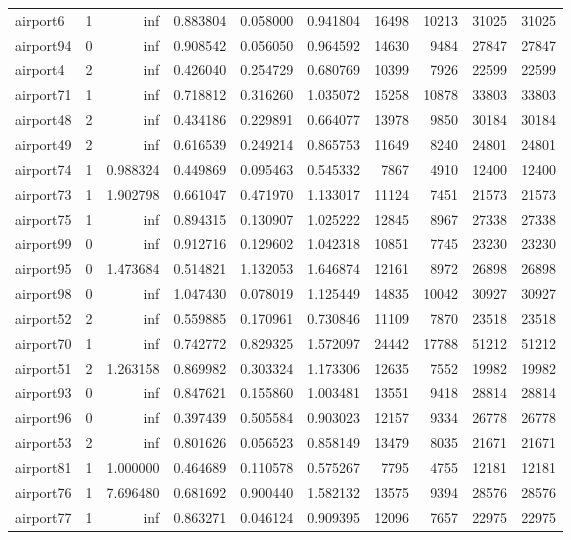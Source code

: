 \begin{longtable}{|l|r|r|r|r|r|r|r|r|r|}
airport6 & 1 & inf & 0.883804 & 0.058000 & 0.941804 & 16498 & 10213 & 31025 & 31025 \\
airport94 & 0 & inf & 0.908542 & 0.056050 & 0.964592 & 14630 & 9484 & 27847 & 27847 \\
airport4 & 2 & inf & 0.426040 & 0.254729 & 0.680769 & 10399 & 7926 & 22599 & 22599 \\
airport71 & 1 & inf & 0.718812 & 0.316260 & 1.035072 & 15258 & 10878 & 33803 & 33803 \\
airport48 & 2 & inf & 0.434186 & 0.229891 & 0.664077 & 13978 & 9850 & 30184 & 30184 \\
airport49 & 2 & inf & 0.616539 & 0.249214 & 0.865753 & 11649 & 8240 & 24801 & 24801 \\
airport74 & 1 & 0.988324 & 0.449869 & 0.095463 & 0.545332 & 7867 & 4910 & 12400 & 12400 \\
airport73 & 1 & 1.902798 & 0.661047 & 0.471970 & 1.133017 & 11124 & 7451 & 21573 & 21573 \\
airport75 & 1 & inf & 0.894315 & 0.130907 & 1.025222 & 12845 & 8967 & 27338 & 27338 \\
airport99 & 0 & inf & 0.912716 & 0.129602 & 1.042318 & 10851 & 7745 & 23230 & 23230 \\
airport95 & 0 & 1.473684 & 0.514821 & 1.132053 & 1.646874 & 12161 & 8972 & 26898 & 26898 \\
airport98 & 0 & inf & 1.047430 & 0.078019 & 1.125449 & 14835 & 10042 & 30927 & 30927 \\
airport52 & 2 & inf & 0.559885 & 0.170961 & 0.730846 & 11109 & 7870 & 23518 & 23518 \\
airport70 & 1 & inf & 0.742772 & 0.829325 & 1.572097 & 24442 & 17788 & 51212 & 51212 \\
airport51 & 2 & 1.263158 & 0.869982 & 0.303324 & 1.173306 & 12635 & 7552 & 19982 & 19982 \\
airport93 & 0 & inf & 0.847621 & 0.155860 & 1.003481 & 13551 & 9418 & 28814 & 28814 \\
airport96 & 0 & inf & 0.397439 & 0.505584 & 0.903023 & 12157 & 9334 & 26778 & 26778 \\
airport53 & 2 & inf & 0.801626 & 0.056523 & 0.858149 & 13479 & 8035 & 21671 & 21671 \\
airport81 & 1 & 1.000000 & 0.464689 & 0.110578 & 0.575267 & 7795 & 4755 & 12181 & 12181 \\
airport76 & 1 & 7.696480 & 0.681692 & 0.900440 & 1.582132 & 13575 & 9394 & 28576 & 28576 \\
airport77 & 1 & inf & 0.863271 & 0.046124 & 0.909395 & 12096 & 7657 & 22975 & 22975 \\

\end{longtable}
